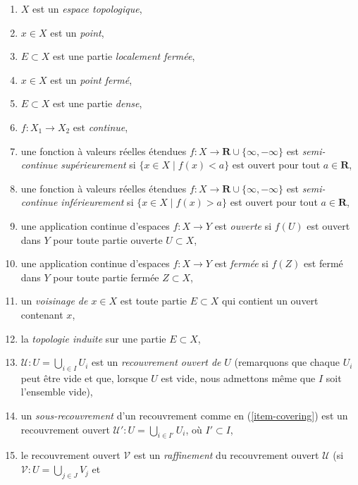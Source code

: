 \begin{enumerate}
\item
\label{item-space}
$X$ est un {\it espace topologique},
\item
\label{item-point}
$x\in X$ est un {\it point},
\item
\label{item-locally-closed}
$E \subset X$ est une partie {\it localement fermée},
\item
\label{item-closed-point}
$x\in X$ est un {\it point fermé},
\item
\label{item-dense}
$E \subset X$ est une partie {\it dense},
\item
\label{item-continuous}
$f : X_1 \to X_2$ est {\it continue},
\item
\label{item-upper-semi-continuous}
une fonction à valeurs réelles étendues
$f : X \to \mathbf{R} \cup \{\infty, -\infty\}$
est {\it semi-continue supérieurement} si $\{x \in X \mid f(x) < a\}$ est
ouvert pour tout $a \in \mathbf{R}$,
\item
\label{item-lower-semi-continuous}
une fonction à valeurs réelles étendues
$f : X \to \mathbf{R} \cup \{\infty, -\infty\}$
est {\it semi-continue inférieurement} si $\{x \in X \mid f(x) > a\}$ est
ouvert pour tout $a \in \mathbf{R}$,
\item une application continue d'espaces $f : X \to Y$ est {\it ouverte} si
$f(U)$ est ouvert dans $Y$ pour toute partie ouverte $U \subset X$,
\item une application continue d'espaces $f : X \to Y$ est {\it fermée} si
$f(Z)$ est fermé dans $Y$ pour toute partie fermée $Z \subset X$,
\item
\label{item-neighbourhood}
un {\it voisinage de $x \in X$} est toute partie $E \subset X$ qui contient un
ouvert contenant $x$,
\item
\label{item-induced-topology}
la {\it topologie induite} sur une partie $E \subset X$,
\item
\label{item-covering}
$\mathcal{U} : U = \bigcup_{i \in I} U_i$ est un {\it recouvrement ouvert de}
$U$ (remarquons que chaque $U_i$ peut être vide et que, lorsque $U$ est vide,
nous admettons même que $I$ soit l'ensemble vide),
\item
\label{item-subcover}
un {\it sous-recouvrement} d'un recouvrement comme en
(\ref{item-covering}) est un recouvrement ouvert
$\mathcal{U}' : U = \bigcup_{i \in I'} U_i$, où $I' \subset I$,
\item
\label{item-refinement}
le recouvrement ouvert $\mathcal{V}$ est un {\it raffinement} du recouvrement
ouvert $\mathcal{U}$ (si $\mathcal{V} : U = \bigcup_{j \in J} V_j$ et

\end{enumerate}
